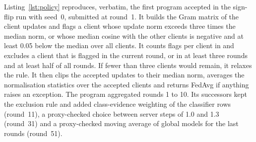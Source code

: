 \documentclass[3p,times,a4paper]{elsarticle}
\newcommand{\code}[1]{\texttt{\detokenize{#1}}}
\begin{document}
Listing~\ref{lst:policy} reproduces, verbatim, the first program accepted in the sign-flip run with seed~0, submitted at round~1. It builds the Gram matrix of the client updates and flags a client whose update norm exceeds three times the median norm, or whose median cosine with the other clients is negative and at least 0.05 below the median over all clients. It counts flags per client in \code{ctx.memory} and excludes a client that is flagged in the current round, or in at least three rounds and at least half of all rounds. If fewer than three clients would remain, it relaxes the rule. It then clips the accepted updates to their median norm, averages the normalisation statistics over the accepted clients and returns FedAvg if anything raises an exception. The program aggregated rounds 1 to 10. Its successors kept the exclusion rule and added class-evidence weighting of the classifier rows (round~11), a proxy-checked choice between server steps of 1.0 and 1.3 (round~31) and a proxy-checked moving average of global models for the last rounds (round~51).
\end{document}
